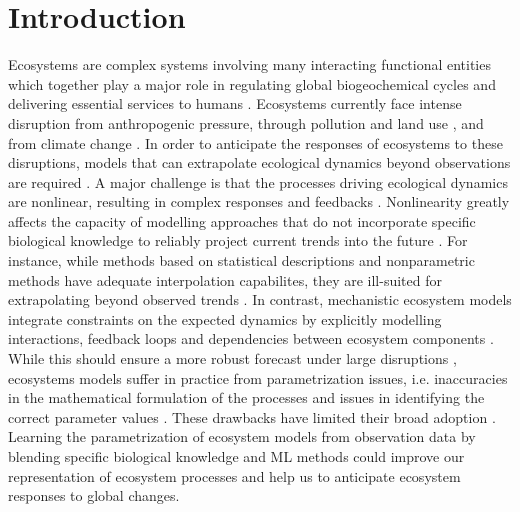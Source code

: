 \section{Introduction}

Ecosystems are complex systems involving many interacting functional entities which together play a major role in regulating global biogeochemical cycles \cite{Bonan2008} and delivering essential services to humans \cite{Kremen2005}.
%
Ecosystems currently face intense disruption from anthropogenic pressure, through pollution and land use \cite{Doney2010,Ellis2011}, and from climate change \cite{Midgley2019}. In order to anticipate the responses of ecosystems to these disruptions, models that can extrapolate ecological dynamics beyond observations are required \cite{Boyd2012}. 
%
A major challenge is that the processes driving ecological dynamics are nonlinear, resulting in complex responses and feedbacks \cite{Scheffer2001}. Nonlinearity greatly affects the capacity of modelling approaches that do not incorporate specific biological knowledge to reliably project current trends into the future \cite{Barnosky2012}. For instance, while methods based on statistical descriptions \cite{Deneu2021} and nonparametric methods \cite{Ye2015,Ye2016,Deyle2016} have adequate interpolation capabilites, they are ill-suited for extrapolating beyond observed trends \cite{Barnosky2012,Urban2016}.
%
In contrast, mechanistic ecosystem models integrate constraints on the expected dynamics by explicitly modelling interactions, feedback loops and dependencies between ecosystem components \cite{Geary2020}. While this should ensure a more robust forecast under large disruptions \cite{Norberg2012}, ecosystems models suffer in practice from parametrization issues, i.e. inaccuracies in the mathematical formulation of the processes and issues in identifying the correct parameter values \cite{DeAngelis2015}. These drawbacks have limited their broad adoption \cite{Urban2016}.
%
Learning the parametrization of ecosystem models from observation data by blending specific biological knowledge and ML methods could improve our representation of ecosystem processes and help us to anticipate ecosystem responses to global changes.

